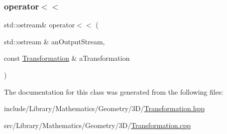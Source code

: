 \subsubsection{\texorpdfstring{operator$<$$<$}{operator<<}}
{\footnotesize\ttfamily std\+::ostream\& operator$<$$<$ (\begin{DoxyParamCaption}\item[{std\+::ostream \&}]{an\+Output\+Stream,  }\item[{const \hyperlink{classlibrary_1_1math_1_1geom_1_1d3_1_1_transformation}{Transformation} \&}]{a\+Transformation }\end{DoxyParamCaption})\hspace{0.3cm}{\ttfamily [friend]}}



The documentation for this class was generated from the following files\+:\begin{DoxyCompactItemize}
\item 
include/\+Library/\+Mathematics/\+Geometry/3\+D/\hyperlink{3_d_2_transformation_8hpp}{Transformation.\+hpp}\item 
src/\+Library/\+Mathematics/\+Geometry/3\+D/\hyperlink{3_d_2_transformation_8cpp}{Transformation.\+cpp}\end{DoxyCompactItemize}
